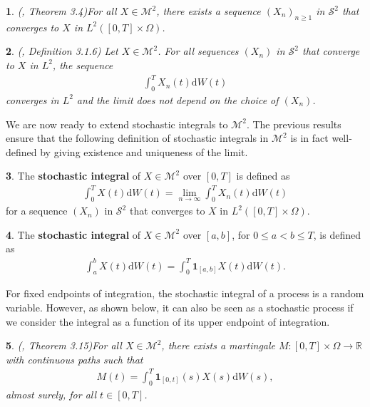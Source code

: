 \documentclass[english]{article}
\numberwithin{equation}{section}
\numberwithin{figure}{section}
\theoremstyle{bolddescit}
\newtheorem{theorem}{\protect\theoremname}[section]
\theoremstyle{definition}
\newtheorem{definition}[theorem]{\protect\definitionname}
\theoremstyle{definition}
\theoremstyle{plain}
\theoremstyle{plain}
\theoremstyle{bolddesc}
\theoremstyle{plain}
\newtheorem{proposition}[theorem]{\protect\propositionname}
\theoremstyle{remark}
\providecommand{\definitionname}{Definition}
\providecommand{\propositionname}{Proposition}
\providecommand{\theoremname}{Theorem}
\begin{document}
\begin{theorem}
  (\cite{capinski_stochastic_2012}, Theorem 3.4)\label{thm:s2-m2-conv}
  For all $X \in \mathcal{M}^2$, there exists a sequence $(X_n)_{n \ge 1}$ in $\mathcal{S}^2$ that converges to $X$ in $L^2([0,T] \times \Omega)$.
\end{theorem}

\begin{theorem}
  (\cite{oksendal_stochastic_2003}, Definition 3.1.6)
  Let $X \in \mathcal{M}^2$. For all sequences $(X_n)$ in $\mathcal{S}^2$ that converge to $X$ in $L^2$, the sequence
  \begin{align*}
    \int_0^T X_n(t) \mathrm{d}W(t)
  \end{align*}
  converges in $L^2$ and the limit does not depend on the choice of $(X_n)$.
\end{theorem}

We are now ready to extend stochastic integrals to $\mathcal{M}^2$. The previous results ensure that the following definition of stochastic integrals in $\mathcal{M}^2$ is in fact well-defined by giving existence and uniqueness of the limit.

\begin{definition}
  The \textbf{stochastic integral} of $X \in \mathcal{M}^2$ over $[0,T]$ is defined as
  \begin{align*}
    \int_0^T X(t) \mathrm{d}W(t) = \lim_{n \to \infty} \int_0^T X_n(t) \mathrm{d}W(t)
  \end{align*}
  for a sequence $(X_n)$ in $\mathcal{S}^2$ that converges to $X$ in $L^2([0,T] \times \Omega)$.
\end{definition}

\begin{definition}
  The \textbf{stochastic integral} of $X \in \mathcal{M}^2$ over $[a,b]$, for $0 \le a < b \le T$, is defined as
  \begin{align*}
    \int_a^b X(t) \mathrm{d}W(t)
    = \int_0^T \mathbf{1}_{[a,b]} X(t) \mathrm{d}W(t).
  \end{align*}
\end{definition}

For fixed endpoints of integration, the stochastic integral of a process is a random variable. However, as shown below, it can also be seen as a stochastic process if we consider the integral as a function of its upper endpoint of integration.

\begin{proposition}(\cite{capinski_stochastic_2012}, Theorem 3.15)\label{prop:stochastic-integral-martingale}
  For all $X \in \mathcal{M}^2$, there exists a martingale $M : [0,T] \times \Omega \to \mathbb{R}$ with continuous paths such that
  \begin{align*}
    M(t) = \int_0^T \mathbf{1}_{[0,t]}(s) X(s) \mathrm{d}W(s),
  \end{align*}
  almost surely, for all $t \in [0,T]$.
\end{proposition}
\end{document}
